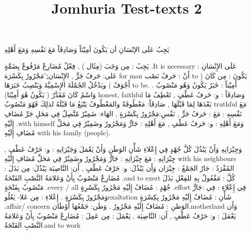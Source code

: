 \documentclass[a4paper]{article}
\title{Jomhuria Test-texts 2}
\begin{document}
\pagecolor{pagecolor}
\color{textcolor}

\begin{english}\maketitle\end{english}
\newpage

\begin{flushright}

\huge
يَجِبُ عَلَى الإنْسَانِ أن يَكُونَ أمِيْنَاً وَصَادِقَاً مَعَ نَفْسِهِ وَمَعَ أَهْلِهِ
 
يَجِبُ : مِن وَجَبَ (مِثَال ) , فِعْلٌ مُضَارِعٌ مَرْفُوعٌ بِضَمَّةٍ .It is necessary
عَلَى الإِنْسَانِ : عَلى: حَرفُ جَرٍّ , الإِنْسَان:ِ َمَجْرُورٌ بِكَسْرَة  for man
أَنْ : حَرفُ نَصْب to
يَكُونَ : مِن كَانَ ( أَجْوَفٌ ) ويَدْخُلُ الجُمْلَةَ الإِسْمِيَّةَ وَيَنْصِبُ خَبَرَهَا to be.
أَمِيْناً : خَبَرُ يَكُونُ وَهُو مَنْصُوبٌ . وَاسْمُ كَانَ مُقَدَّرٌ ( يَكُونُ هُوَ أَمِيْنَا) honest, faithful
وَصَادِقَاً : و: حَرفُ عَطْفٍ , تَعْطِفُ مَا بَعْدَهَا لِمَا قَبْلَهَا , صَادِقَاً: مَعْطُوفَةٌ
            والمَعْطُوفُ يَتْبَعُ مَا قَبْلَهُ لذلِكَ فَهُوَ مَنْصُوبٌ  truthful
مَعَ نَفْسِهِ : مَعَ : حَرفُ جَرٍّ , نَفْسِ:مَجْرُورٌ بِكَسْرَةٍ , الهَاء: ضَمِيْرٌ مًتَّصِلٌ
            فِي مَحَلِ جَرِّ مُضَافِ إِلَيْهِ .with himself
وَمَعَ أَهْلِهِ : و: حَرفُ عَطْفٍ , مَعَ أَهْلِهِ : جَارٌّ وَمَجْرُورٌ وضَمِيْرٌ فِي مَحَلِّ
            مُضَافِ إِلَيْهِ with his family (people).
 
وَجِيْرَانِهِ وَأَنْ يَبْذُلَ كُلَّ جُهْدٍ فِي إِعْلاءِ شَأْنِ الوَطَنِ وَأَنْ يَعْمَلَ
وَجَيْرَانِهِ : و: حَرْفُ عَطْفٍ , جِِيْرَانِهِ : مَعَ جِيْرَانِهِ : جَارٌّ وَمَجْرُورٌ
                وضَمِيْرٌ فِي مَحَلِّ مُضَافِ إِلَيْهِ with his neighbours      
                المُفْرَدُ : جَارٌ       الجَمْعُ : جِيْرَان
وَأَن يَبْذُلَ: و: حَرْفُ عَطْفٍ , أَن: النَّاصِبَة      يَبْذُلَ: مِن بَذَلَ : مُضَارِعٌ
            مَنْصُوبٌ بِأَنْ وَعَلامَةُ النَّصْبِ الفَتْحَةُ .and to exert
كُلَّ :          مَفْعُولٌ بِهِ للفِعْلِ بَذَلَ مَنْصُوبٌ بِفَتْحَةٍ .every / all
جُهْدٍ : مُضَافُ إِلَيْهِ مَجْرُورٌ بِكَسْرِةٍ .effort
فِي إِعْلاءِ : فِي :جَارٌّ وَمَجْرُورٌ بِكَسْرَةٍ . إِعْلاءِ : مِن عَلا- يَعْلُوexaltation
شَأْنِ : مُضَافٌ إِلَيْهِ مَجْرُورٌ بِكِسْرَةٍ .affair/ concern
الوَطنِ : مُضَافٌ إِلَيْهِ مَجْرُورٌ . وَطَن: جَمْعُهَا أَوْطَان.motherland
وَأَن يَعْمَلَ : و: حَرْفُ عَطْفٍ , أَن: النَّاصِبَة , يَعْمَلَ : مِن عَمِلَ : مُضَارِعٌ
            مَنْصُوبٌ بِأَنْ وَعَلامَةُ النَّصْبِ الفَتْحَةُ.and to work
 

\end{flushright}
\end{document}

